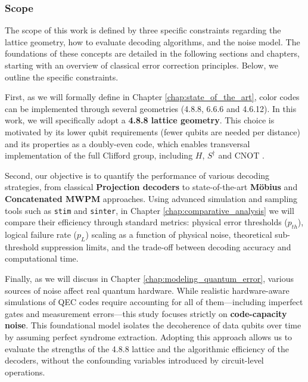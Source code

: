 \subsubsection*{Scope}

The scope of this work is defined by three specific constraints regarding the lattice geometry, how to evaluate decoding algorithms, and the noise model. The foundations of these concepts are detailed in the following sections and chapters, starting with an overview of classical error correction principles. Below, we outline the specific constraints.

First, as we will formally define in Chapter \ref{chap:state_of_the_art}, color codes can be implemented through several geometries (4.8.8, 6.6.6 and 4.6.12). In this work, we will specifically adopt a \textbf{4.8.8 lattice geometry}. This choice is motivated by its lower qubit requirements (fewer qubits are needed per distance) and its properties as a doubly-even code, which enables transversal implementation of the full Clifford group, including $H$, $S^\dagger$ and $\text{CNOT}$ \cite{bombin_martindelgado_2006}.

Second, our objective is to quantify the performance of various decoding strategies, from classical \textbf{Projection decoders} to state-of-the-art \textbf{Möbius} and \textbf{Concatenated MWPM} approaches. Using advanced simulation and sampling tools such as \texttt{stim} \cite{gidney2021stim} and \texttt{sinter}, in Chapter \ref{chap:comparative_analysis} we will compare their efficiency through standard metrics: physical error thresholds ($p_{th}$), logical failure rate ($p_L$) scaling as a function of physical noise, theoretical sub-threshold suppression limits, and the trade-off between decoding accuracy and computational time.

 Finally, as we will discuss in Chapter \ref{chap:modeling_quantum_error}, various sources of noise affect real quantum hardware. While realistic hardware-aware simulations of QEC codes require accounting for all of them—including imperfect gates and measurement errors—this study focuses strictly on \textbf{code-capacity noise}. This foundational model isolates the decoherence of data qubits over time by assuming perfect syndrome extraction. Adopting this approach allows us to evaluate the strengths of the 4.8.8 lattice and the algorithmic efficiency of the decoders, without the confounding variables introduced by circuit-level operations. 

